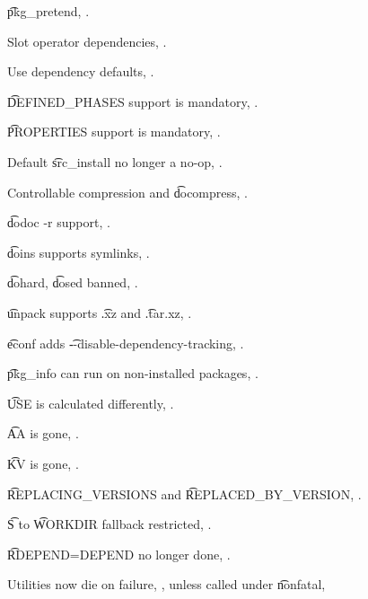 \begin{compactitem}
\item \t{pkg\_pretend}, .
\item Slot operator dependencies, .
\item Use dependency defaults, .
\item \t{DEFINED\_PHASES} support is mandatory, .
\item \t{PROPERTIES} support is mandatory, .
\item Default \t{src\_install} no longer a no-op, .
\item Controllable compression and \t{docompress}, .
\item \t{dodoc -r} support, .
\item \t{doins} supports symlinks, .
\item \t{dohard}, \t{dosed} banned, .
\item \t{unpack} supports \t{.xz} and \t{.tar.xz}, .
\item \t{econf} adds \t{-{}-disable-dependency-tracking}, .
\item \t{pkg\_info} can run on non-installed packages, .
\item \t{USE} is calculated differently, .
\item \t{AA} is gone, .
\item \t{KV} is gone, .
\item \t{REPLACING\_VERSIONS} and \t{REPLACED\_BY\_VERSION}, .
\item \t{S} to \t{WORKDIR} fallback restricted, .
\item \t{RDEPEND=DEPEND} no longer done, .
\item Utilities now die on failure, , unless called under \t{nonfatal},
\end{compactitem}


